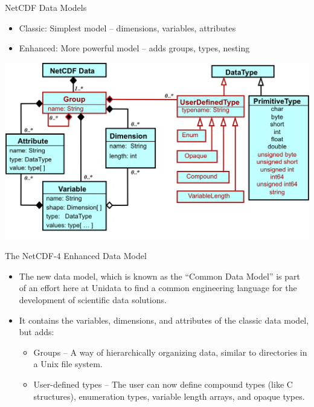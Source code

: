 \documentclass[compress,11pt,xcolor=svgnames,aspectratio=169]{beamer}
\begin{document}
\begin{frame}[t]{NetCDF Data Models}

    \begin{itemize}

        \item Classic: Simplest model -- dimensions, variables, attributes

        \item Enhanced: More powerful model -- adds groups, types, nesting

    \end{itemize}

    \begin{center}
    \includegraphics[scale=0.5]{fig/nc4-uml}
    \end{center}

\end{frame}

\begin{frame}[t]{The NetCDF-4 Enhanced Data Model}

\begin{itemize}
\setlength\itemsep{0.4cm}

    \item The new data model, which is known as the “Common Data Model” is part of an effort here at Unidata to find a common engineering language for the development of scientific data solutions.

    \item It contains the variables, dimensions, and attributes of the classic data model, but adds:

    \begin{itemize}

        \item Groups -- A way of hierarchically organizing data, similar to directories in a Unix file system.

        \item User-defined types -- The user can now define compound types (like C structures), enumeration types, variable length arrays, and opaque types.

    \end{itemize}

\end{itemize}

\end{frame}
\end{document}
